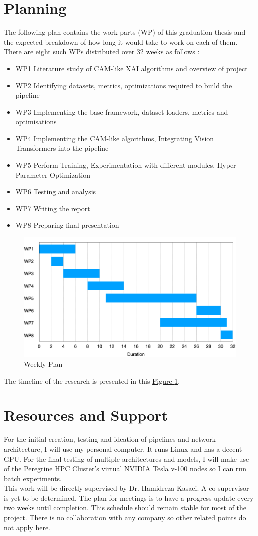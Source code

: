 \section{Planning} \label{section:plan}
The following plan contains the work parts (WP) of this graduation thesis and the expected breakdown of how long it would take to work on each of them. There are eight such WPs distributed over 32 weeks as follows : 
\begin{itemize}
    \item WP1	Literature study of CAM-like XAI algorithms and overview of project
    \item WP2	Identifying datasets, metrics, optimizations required to build the pipeline
    \item WP3	Implementing the base framework, dataset loaders, metrics and optimisations
    \item WP4	Implementing the CAM-like algorithms, Integrating Vision Transformers into the pipeline
    \item WP5	Perform Training, Experimentation with different modules, Hyper Parameter Optimization
    \item WP6	Testing and analysis
    \item WP7	Writing the report
    \item WP8	Preparing final presentation
\end{itemize}
\begin{figure}[!htbp]
  \centering
  \includegraphics[width=.8\textwidth]{images/gantt_chart.pdf}
  \caption{Weekly Plan}
  \label{fig:plan}
\end{figure}

The timeline of the research is presented in this \hyperref[fig:plan]{Figure \ref{fig:plan}}.

\section{Resources and Support}
For the initial creation, testing and ideation of pipelines and network architecture, I will use my personal computer. It runs Linux and has a decent GPU. For the final testing of multiple architectures and models, I will make use of the Peregrine HPC Cluster's virtual NVIDIA Tesla v-100 nodes so I can run batch experiments.\\
This work will be directly supervised by Dr. Hamidreza Kasaei. A co-supervisor is yet to be determined. The plan for meetings is to have a progress update every two weeks until completion. This schedule should remain stable for most of the project. There is no collaboration with any company so other related points do not apply here.